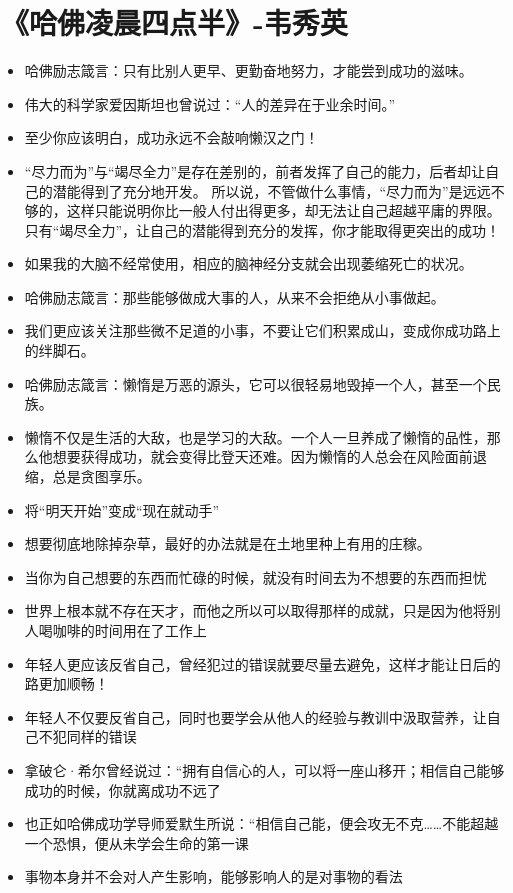 \documentclass[UTF8,a4paper,8pt]{ctexbook}
\begin{document}
	\section{《哈佛凌晨四点半》-韦秀英 }
		\begin{itemize}
			\item 哈佛励志箴言：只有比别人更早、更勤奋地努力，才能尝到成功的滋味。
			\item 伟大的科学家爱因斯坦也曾说过：“人的差异在于业余时间。”
			\item 至少你应该明白，成功永远不会敲响懒汉之门！
			\item “尽力而为”与“竭尽全力”是存在差别的，前者发挥了自己的能力，后者却让自己的潜能得到了充分地开发。 所以说，不管做什么事情，“尽力而为”是远远不够的，这样只能说明你比一般人付出得更多，却无法让自己超越平庸的界限。 只有“竭尽全力”，让自己的潜能得到充分的发挥，你才能取得更突出的成功！
			\item 如果我的大脑不经常使用，相应的脑神经分支就会出现萎缩死亡的状况。
			\item 哈佛励志箴言：那些能够做成大事的人，从来不会拒绝从小事做起。
			\item 我们更应该关注那些微不足道的小事，不要让它们积累成山，变成你成功路上的绊脚石。
			\item 哈佛励志箴言：懒惰是万恶的源头，它可以很轻易地毁掉一个人，甚至一个民族。
			\item 懒惰不仅是生活的大敌，也是学习的大敌。一个人一旦养成了懒惰的品性，那么他想要获得成功，就会变得比登天还难。因为懒惰的人总会在风险面前退缩，总是贪图享乐。
			\item 将“明天开始”变成“现在就动手”
			\item 想要彻底地除掉杂草，最好的办法就是在土地里种上有用的庄稼。
			\item 当你为自己想要的东西而忙碌的时候，就没有时间去为不想要的东西而担忧
			\item 世界上根本就不存在天才，而他之所以可以取得那样的成就，只是因为他将别人喝咖啡的时间用在了工作上
			\item 年轻人更应该反省自己，曾经犯过的错误就要尽量去避免，这样才能让日后的路更加顺畅！
			\item 年轻人不仅要反省自己，同时也要学会从他人的经验与教训中汲取营养，让自己不犯同样的错误
			\item 拿破仑·希尔曾经说过：“拥有自信心的人，可以将一座山移开；相信自己能够成功的时候，你就离成功不远了
			\item 也正如哈佛成功学导师爱默生所说：“相信自己能，便会攻无不克……不能超越一个恐惧，便从未学会生命的第一课
			\item 事物本身并不会对人产生影响，能够影响人的是对事物的看法

\end{itemize}
\end{document}
